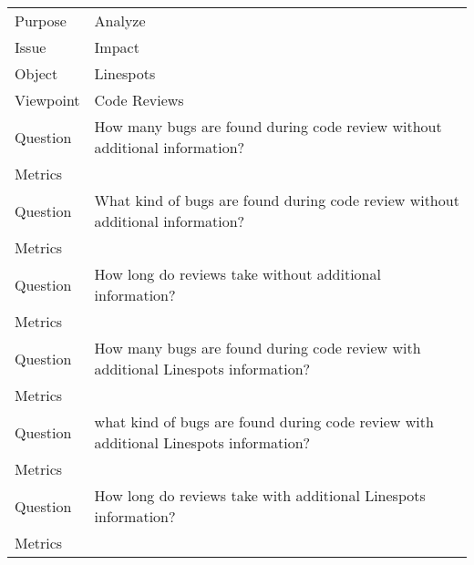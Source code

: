 \begin{center}
\begin{tabularx}{\linewidth}{| l | X |}
 \hline
 Purpose & Analyze \\ 
 Issue & Impact \\  
 Object & Linespots \\
 Viewpoint & Code Reviews\\
 \hline \hline 
 Question & How many bugs are found during code review without additional information?  \\
 \hline
 Metrics &    \\
 \hline \hline
 Question & What kind of bugs are found during code review without additional information?  \\
 \hline
 Metrics &    \\
 \hline \hline
 Question & How long do reviews take without additional information?  \\
 \hline
 Metrics &    \\
 \hline
 Question & How many bugs are found during code review with additional Linespots information?  \\
 \hline
 Metrics &    \\
 \hline \hline
 Question & what kind of bugs are found during code review with additional Linespots information?  \\
 \hline
 Metrics &    \\
 \hline \hline
 Question & How long do reviews take with additional Linespots information?  \\
 \hline
 Metrics &    \\
 \hline
\end{tabularx}
\end{center}